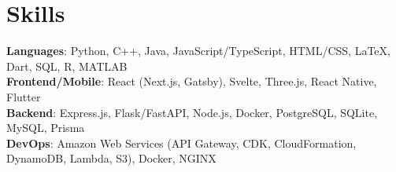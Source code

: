 \documentclass{article}
\newcommand{\resumesection}[3]{
    \subsection*{#1}
    \ 
    \ 
    \small
    \textcolor{csufgrey}{#2}
    \normalsize
    \hfill
    \textcolor{black}{#3}
    \normalsize
}
\begin{document}
\section*{Skills}
\textbf{Languages}: Python, C++, Java, JavaScript/TypeScript, HTML/CSS, {\selectfont\LaTeX}, Dart, SQL, R, MATLAB\\
\textbf{Frontend/Mobile}: React (Next.js, Gatsby), Svelte, Three.js, React Native, Flutter\\
\textbf{Backend}: Express.js, Flask/FastAPI, Node.js, Docker, PostgreSQL, SQLite, MySQL, Prisma\\
\textbf{DevOps}: Amazon Web Services (API Gateway, CDK, CloudFormation, DynamoDB, Lambda, S3), Docker, NGINX
\end{document}
